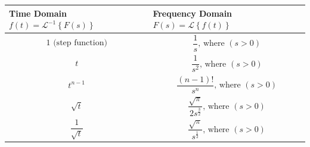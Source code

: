 \documentclass[
]{book}
\begin{document}
\begin{longtable}[]{@{}ll@{}}
\toprule
\begin{minipage}[b]{0.42\columnwidth}\raggedright
Time Domain \(f(t) = \mathcal{L}^{-1} \left\{ F \left( s \right) \right\}\)\strut
\end{minipage} & \begin{minipage}[b]{0.52\columnwidth}\raggedright
Frequency Domain \(F\left( s \right) = \mathcal{L} \left\{ f \left( t \right) \right\}\)\strut
\end{minipage}\tabularnewline
\midrule
\endhead
\begin{minipage}[t]{0.42\columnwidth}\raggedright
\[1 \text{ (step function)}\]\strut
\end{minipage} & \begin{minipage}[t]{0.52\columnwidth}\raggedright
\[\frac{1}{s} \text{, where } \left(s >  0\right) \]\strut
\end{minipage}\tabularnewline
\begin{minipage}[t]{0.42\columnwidth}\raggedright
\[t\]\strut
\end{minipage} & \begin{minipage}[t]{0.52\columnwidth}\raggedright
\[\frac{1}{s^2} \text{, where } \left(s >  0\right) \]\strut
\end{minipage}\tabularnewline
\begin{minipage}[t]{0.42\columnwidth}\raggedright
\[t^{n-1}\]\strut
\end{minipage} & \begin{minipage}[t]{0.52\columnwidth}\raggedright
\[\frac{\left( n-1 \right)!}{s^n} \text{, where } \left(s >  0\right) \]\strut
\end{minipage}\tabularnewline
\begin{minipage}[t]{0.42\columnwidth}\raggedright
\[\sqrt{t}\]\strut
\end{minipage} & \begin{minipage}[t]{0.52\columnwidth}\raggedright
\[\frac{{\sqrt \pi  }}{{2{s^{\frac{3}{2}}}}} \text{, where } \left(s >  0\right) \]\strut
\end{minipage}\tabularnewline
\begin{minipage}[t]{0.42\columnwidth}\raggedright
\[\frac{1}{\sqrt{t}}\]\strut
\end{minipage} & \begin{minipage}[t]{0.52\columnwidth}\raggedright
\[\frac{{\sqrt \pi  }}{{{s^{\frac{1}{2}}}}} \text{, where } \left(s >  0\right) \]\strut
\end{minipage}\tabularnewline

\end{longtable}
\end{document}
